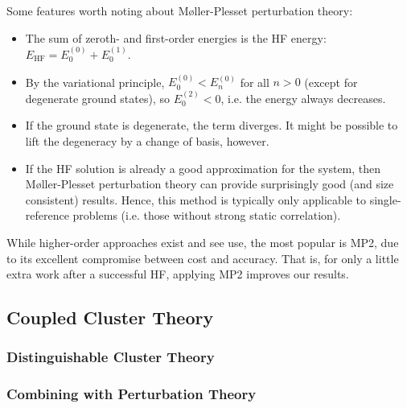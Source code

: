 Some features worth noting about M{\o}ller-Plesset perturbation theory:
\begin{itemize}
    \item The sum of zeroth- and first-order energies is the HF energy: $E_\mathrm{HF} = E_0^{(0)} + E_0^{(1)}$.
    \item By the variational principle, $E_0^{(0)}<E_n^{(0)}$ for all $n>0$ (except for degenerate ground states), so $E_0^{(2)}<0$, i.e. the energy always decreases.
    \item If the ground state is degenerate, the term diverges. It might be possible to lift the degeneracy by a change of basis, however.
    \item If the \gls{HF} solution is already a good approximation for the system, then M{\o}ller-Plesset perturbation theory can provide surprisingly good (and size consistent) results. Hence, this method is typically only applicable to single-reference problems (i.e. those without strong static correlation).
\end{itemize}

While higher-order approaches exist and see use, the most popular is \gls{MP2}, due to its excellent compromise between cost and accuracy. That is, for only a little extra work after a successful \gls{HF}, applying \gls{MP2} improves our results.

\subsection{Coupled Cluster Theory}


\subsubsection{Distinguishable Cluster Theory}

\subsubsection{Combining with Perturbation Theory}


